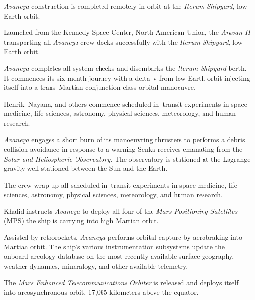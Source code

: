 {\it Avaneya} construction is completed remotely in orbit at the {\it Iterum Shipyard}, low Earth orbit.
\StopTimelineDate

Launched from the Kennedy Space Center, North American Union, the {\it Aravan II} transporting all {\it Avaneya} crew docks successfully with the {\it Iterum Shipyard}, low Earth orbit.
\StopTimelineDate

{\it Avaneya} completes all system checks and disembarks the {\it Iterum Shipyard} berth. It commences its six month journey with a delta--v from low Earth orbit injecting itself into a trans--Martian conjunction class orbital manoeuvre.
\StopTimelineDate

Henrik, Nayana, and others commence scheduled in--transit experiments in space medicine, life sciences, astronomy, physical sciences, meteorology, and human research.
\StopTimelineDate

{\it Avaneya} engages a short burn of its manoeuvring thrusters to performs a debris collision avoidance in response to a warning Senka receives emanating from the {\it Solar and Heliospheric Observatory}. The observatory is stationed at the Lagrange  gravity well stationed between the Sun and the Earth.
\StopTimelineDate

The crew wrap up all scheduled in--transit experiments in space medicine, life sciences, astronomy, physical sciences, meteorology, and human research.
\StopTimelineDate

Khalid instructs {\it Avaneya} to deploy all four of the {\it Mars Positioning Satellites} (MPS) the ship is carrying into high Martian orbit.
\StopTimelineDate

Assisted by retrorockets, {\it Avaneya} performs orbital capture by aerobraking into Martian orbit. The ship's various instrumentation subsystems update the onboard areology database on the most recently available surface geography, weather dynamics, mineralogy, and other available telemetry.

The {\it Mars Enhanced Telecommunications Orbiter} is released and deploys itself into areosynchronous orbit, 17,065 kilometers above the equator.

